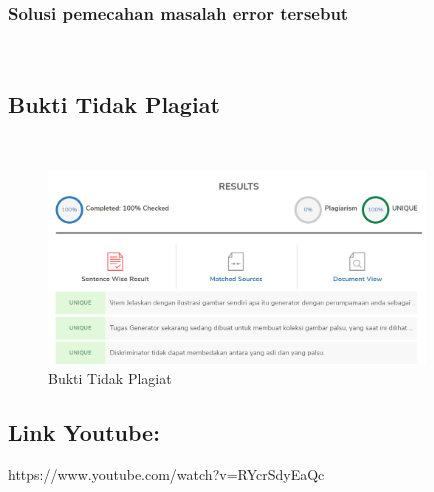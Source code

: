 	\subsubsection{Solusi pemecahan masalah error tersebut}\hfill\\
	
\subsection{Bukti Tidak Plagiat}
\hfill\\
	\begin{figure}[H]
		\centerline{\includegraphics[width=10cm]{figures/1174076/figures9/plagiat.png}}
		\caption{Bukti Tidak Plagiat}
		\label{labelgambar}
	\end{figure}

\subsection{Link Youtube:}
https://www.youtube.com/watch?v=RYcrSdyEaQc
	